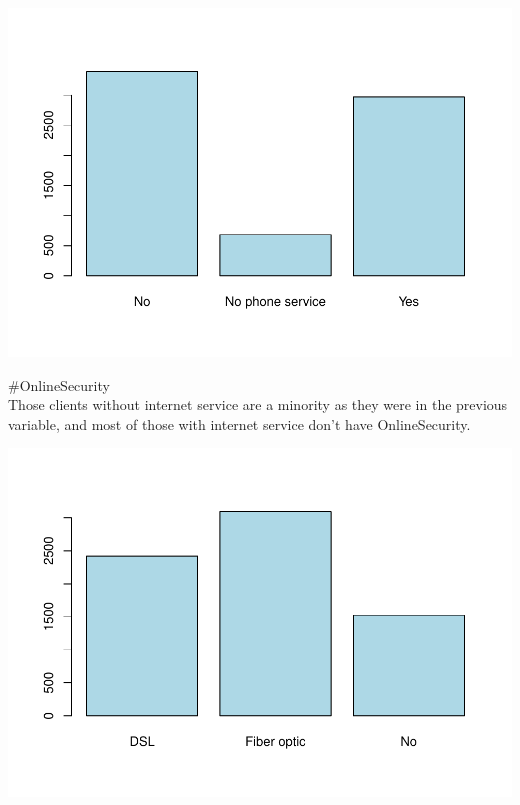 \documentclass[
]{article}
\newenvironment{Shaded}{\begin{snugshade}}{\end{snugshade}}
\newcommand{\AttributeTok}[1]{\textcolor[rgb]{0.13,0.29,0.53}{#1}}
\newcommand{\CommentTok}[1]{\textcolor[rgb]{0.56,0.35,0.01}{\textit{#1}}}
\newcommand{\FunctionTok}[1]{\textcolor[rgb]{0.13,0.29,0.53}{\textbf{#1}}}
\newcommand{\NormalTok}[1]{#1}
\newcommand{\OtherTok}[1]{\textcolor[rgb]{0.56,0.35,0.01}{#1}}
\newcommand{\SpecialCharTok}[1]{\textcolor[rgb]{0.81,0.36,0.00}{\textbf{#1}}}
\newcommand{\StringTok}[1]{\textcolor[rgb]{0.31,0.60,0.02}{#1}}
\begin{document}
\includegraphics{Assignment2_script_files/figure-latex/unnamed-chunk-13-1.pdf}

\#OnlineSecurity\\
Those clients without internet service are a minority as they were in
the previous variable, and most of those with internet service don't
have OnlineSecurity.

\begin{Shaded}
\end{Shaded}

\includegraphics{Assignment2_script_files/figure-latex/unnamed-chunk-14-1.pdf}
\end{document}
